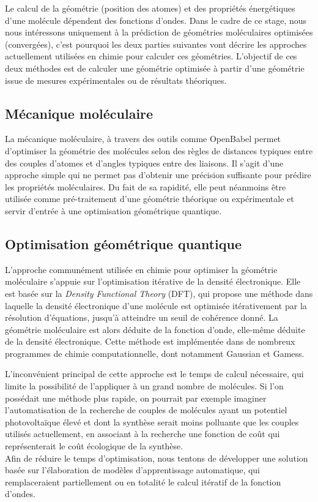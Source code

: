 \par Le calcul de la géométrie (position des atomes) et des propriétés énergétiques d'une molécule dépendent des fonctions d'ondes. Dans le cadre de ce stage, nous nous intéressons uniquement à la prédiction de géométries moléculaires optimisées (convergées), c'est pourquoi les deux parties suivantes vont décrire les approches actuellement utilisées en chimie pour calculer ces géométries. L'objectif de ces deux méthodes est de calculer une géométrie optimisée à partir d'une géométrie issue de mesures expérimentales ou de résultats théoriques.

\subsection{Mécanique moléculaire}
La mécanique moléculaire, à travers des outils comme OpenBabel\cite{openbabel} permet d'optimiser la géométrie des molécules selon des règles de distances typiques entre des couples d'atomes et d'angles typiques entre des liaisons. Il s'agit d'une approche simple qui ne permet pas d'obtenir une précision suffisante pour prédire les propriétés moléculaires. Du fait de sa rapidité, elle peut néanmoins être utilisée comme pré-traitement d'une géométrie théorique ou expérimentale et servir d'entrée à une optimisation géométrique quantique. 

\subsection{Optimisation géométrique quantique}
\par L'approche communément utilisée en chimie pour optimiser la géométrie moléculaire s'appuie sur l'optimisation itérative de la densité électronique. Elle est basée sur la \emph{Density Functional Theory} (DFT), qui propose une méthode dans laquelle la densité électronique d'une molécule est optimisée itérativement par la résolution d'équations, jusqu'à atteindre un seuil de cohérence donné. La géométrie moléculaire est alors déduite de la fonction d'onde, elle-même déduite de la densité électronique. Cette méthode est implémentée dans de nombreux programmes de chimie computationnelle, dont notamment Gaussian et Gamess.\\

\par L'inconvénient principal de cette approche est le temps de calcul nécessaire, qui limite la possibilité de l'appliquer à un grand nombre de molécules. Si l'on possédait une méthode plus rapide, on pourrait par exemple imaginer l'automatisation de la recherche de couples de molécules ayant un potentiel photovoltaïque élevé et dont la synthèse serait moins polluante que les couples utilisés actuellement, en associant à la recherche une fonction de coût qui représenterait le coût écologique de la synthèse.\\
Afin de réduire le temps d'optimisation, nous tentons de développer une solution basée sur l'élaboration de modèles d'apprentissage automatique, qui remplaceraient partiellement ou en totalité le calcul itératif de la fonction d'ondes.